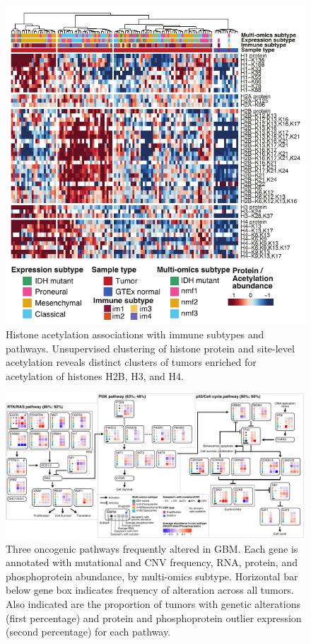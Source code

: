 \begin{figure}[tb]
    \centering
    \includegraphics[width=0.75\linewidth]{figures/chap04_cptac_gbm_discov/figure5_histone_acetyl.pdf}
    \caption[Histone acetylation associations with immune subtypes and pathways.]{%
        Histone acetylation associations with immune subtypes and pathways.
        Unsupervised clustering of histone protein and site-level acetylation reveals distinct clusters of tumors enriched for acetylation of histones H2B, H3, and H4.
    }
    \label{fig:gbm-histone-acetyl}
\end{figure}


\begin{figure}[tb]
    \centering
    \includegraphics[width=\linewidth]{figures/chap04_cptac_gbm_discov/figure7a_pathway_summary.pdf}
    \caption[Summary of pathway alterations.]{%
        Three oncogenic pathways frequently altered in GBM. Each gene is annotated with mutational and CNV frequency, RNA, protein, and phosphoprotein abundance, by multi-omics subtype. Horizontal bar below gene box indicates frequency of alteration across all tumors. Also indicated are the proportion of tumors with genetic alterations (first percentage) and protein and phosphoprotein outlier expression (second percentage) for each pathway.
    }
    \label{fig:gbm-pathway-summary}
\end{figure}

